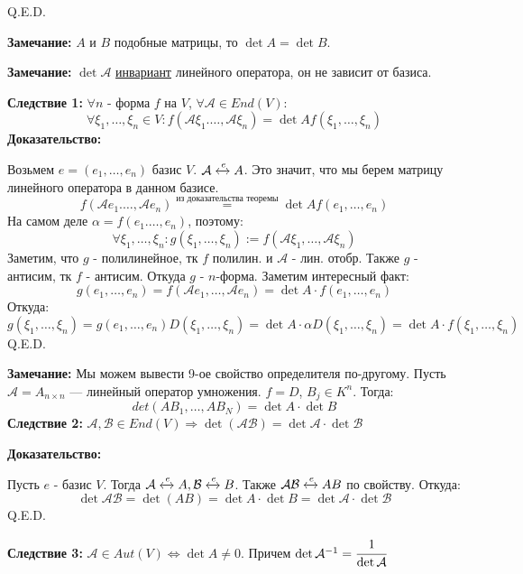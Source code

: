 \hfill Q.E.D.

\textbf{Замечание:} $A$ и $B$ подобные матрицы, то $\det A = \det B$. 

\textbf{Замечание:} $\det \mathcal{A}$ \uline{инвариант} линейного оператора, он не зависит от базиса.

\textbf{Следствие 1:} $\forall n$ - форма $f$ на $V$, $\forall \mathcal{A} \in End(V)$:
$$\forall \xi_1,\ldots, \xi_n \in V: f(\mathcal{A}\xi_1.\ldots, \mathcal{A}\xi_n) =\det A f(\xi_1,\ldots, \xi_n)$$
\textbf{Доказательство:}

Возьмем $e = (e_1,\ldots,e_n)$ базис $V$. $\mathcal{A} \xleftrightarrow{e}A$. Это значит, что мы берем матрицу линейного оператора в данном базисе.
$$f(\mathcal{A}e_1.\ldots, \mathcal{A}e_n) \overset{\text{из доказательства теоремы}}{=}\det Af(e_1,\ldots,e_n)$$
На самом деле $\alpha = f(e_1.\ldots,e_n)$, поэтому:
$$\forall \xi_1,\ldots,\xi_n : g(\xi_1,\ldots,\xi_n):= f(\mathcal{A}\xi_1,\ldots, \mathcal{A} \xi_n)$$
Заметим, что $g$ - полилинейное, тк $f$ полилин. и $\mathcal{A}$ - лин. отобр. Также $g$ - антисим, тк $f$ - антисим. Откуда $g$ - $n$-форма. Заметим интересный факт:
$$g(e_1,\ldots,e_n) = f(\mathcal{A}e_1,\ldots,\mathcal{A}e_n) = \det A \cdot f(e_1,\ldots,e_n)$$
Откуда:
$$ g(\xi_1,\ldots,\xi_n)= g(e_1,\ldots,e_n) D(\xi_1,\ldots,\xi_n) = \det A  \cdot \alpha D(\xi_1,\ldots,\xi_n) = \det A \cdot f(\xi_1,\ldots,\xi_n)$$
\hfill Q.E.D.

\textbf{Замечание:} Мы можем вывести 9-ое свойство определителя по-другому. Пусть $\mathcal{A} = A_{n\times n}$ --- линейный оператор умножения.
$f = D$, $B_j \in K^n$. Тогда:
$$det(AB_1,\ldots, AB_N) = \det A \cdot \det B $$
\textbf{Следствие 2:}
$\mathcal{A},\mathcal{B} \in End(V) \Rightarrow \det(\mathcal{A} \mathcal{B}) = \det \mathcal{A} \cdot \det \mathcal{B}$

\textbf{Доказательство:}

Пусть $e$ - базис $V$. Тогда $\mathcal{A} \xleftrightarrow{e}A, \mathcal{B}\xleftrightarrow{e}B$. Также $\mathcal{A}\mathcal{B} \xleftrightarrow{e}AB$ по свойству. Откуда:
$$\det \mathcal{A}\mathcal{B} = \det(AB) = \det A \cdot \det B = \det \mathcal{A} \cdot \det\mathcal{B}$$
\hfill Q.E.D.

\textbf{Следствие 3:} $\mathcal{A} \in Aut(V) \Leftrightarrow \det A \neq 0$. Причем $\det \mathcal{A}^{-1} = \cfrac{1}{\det \mathcal{A}}$

